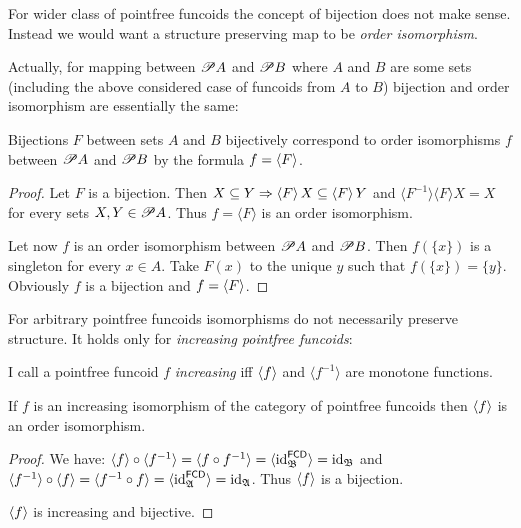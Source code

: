For wider class of pointfree funcoids the concept of bijection does not make
sense. Instead we would want a structure preserving map to be \emph{order
isomorphism}.

Actually, for mapping between $\mathscr{P} A$ and $\mathscr{P} B$ where $A$
and $B$ are some sets (including the above considered case of funcoids from
$A$ to $B$) bijection and order isomorphism are essentially the same:

\begin{prop}
  Bijections $F$ between sets $A$ and $B$ bijectively correspond to order
  isomorphisms $f$ between $\mathscr{P} A$ and $\mathscr{P} B$ by the formula
  $f = \left\langle F\right\rangle$.
\end{prop}

\begin{proof}
  Let $F$ is a bijection. Then $X \subseteq Y \Rightarrow \left\langle F\right\rangle X
  \subseteq \left\langle F\right\rangle Y$ and $\langle F^{- 1} \rangle \langle F
  \rangle X = X$ for every sets $X, Y \in \mathscr{P} A$. Thus $f = \langle F
  \rangle$ is an order isomorphism.
  
  Let now $f$ is an order isomorphism between $\mathscr{P} A$ and $\mathscr{P}
  B$. Then $f (\{ x \})$ is a singleton for every $x \in A$. Take $F (x)$ to
  the unique $y$ such that $f (\{ x \}) = \{ y \}$. Obviously $f$ is a
  bijection and $f = \left\langle F\right\rangle$.
\end{proof}

For arbitrary pointfree funcoids isomorphisms do not necessarily preserve
structure. It holds only for \emph{increasing pointfree funcoids}:

\begin{defn}
  I call a pointfree funcoid $f$ \emph{increasing} iff $\left\langle f\right\rangle$
  and $\langle f^{- 1} \rangle$ are monotone functions.
\end{defn}

\begin{prop}
  If $f$ is an increasing isomorphism of the category of pointfree funcoids
  then $\left\langle f\right\rangle$ is an order isomorphism.
\end{prop}

\begin{proof}
  We have: $\left\langle f\right\rangle \circ \langle f^{- 1} \rangle = \langle f \circ
  f^{- 1} \rangle = \langle {\operatorname{id}}^{\mathsf{FCD}}_{\mathfrak{B}}
  \rangle = {\operatorname{id}}_{\mathfrak{B}}$ and $\langle f^{- 1} \rangle \circ
  \left\langle f\right\rangle = \langle f^{- 1} \circ f \rangle = \langle
  {\operatorname{id}}^{\mathsf{FCD}}_{\mathfrak{A}} \rangle =
  {\operatorname{id}}_{\mathfrak{A}}$. Thus $\left\langle f\right\rangle$ is a bijection.
  
  $\left\langle f\right\rangle$ is increasing and bijective.
\end{proof}

